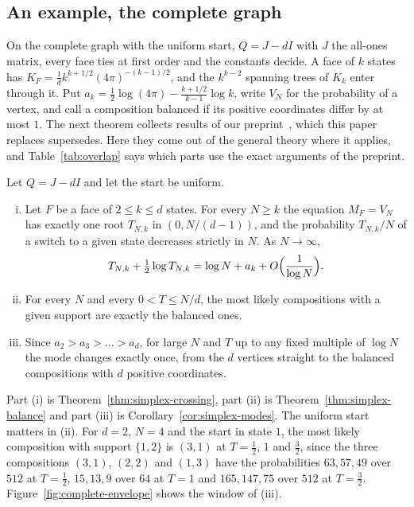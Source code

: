 \ifarxivbuild
\subsection{An example, the complete graph}\label{sec:intro-complete}

On the complete graph with the uniform start, $Q=J-dI$ with $J$ the all-ones
matrix, every face ties at first order and the constants decide. A face of $k$
states has $K_F=\frac1dk^{k+1/2}(4\pi)^{-(k-1)/2}$, and the $k^{k-2}$ spanning
trees of $K_k$ enter through it. Put
$a_k=\frac12\log(4\pi)-\frac{k+1/2}{k-1}\log k$, write $V_N$ for the
probability of a vertex, and call a composition balanced if its positive
coordinates differ by at most $1$. The next theorem collects results of our
preprint~\cite{paperB}, which this paper \ifarxivbuild replaces\else
supersedes\fi. Here they come out of the general theory where it applies, and
Table~\ref{tab:overlap} says which parts use the exact arguments of the
preprint.

\begin{introtheorem}\label{thm:C}
Let $Q=J-dI$ and let the start be uniform.
\begin{enumerate}[(i)]
\item Let $F$ be a face of $2\le k\le d$ states. For every $N\ge k$ the equation
$M_F=V_N$ has exactly one root $T_{N,k}$ in $(0,N/(d-1))$, and the probability
$T_{N,k}/N$ of a switch to a given state decreases strictly in $N$. As
$N\to\infty$,
\[
 T_{N,k}+\tfrac12\log T_{N,k}=\log N+a_k+O\Bigl(\frac1{\log N}\Bigr).
\]
\item For every $N$ and every $0<T\le N/d$, the most likely compositions with a
given support are exactly the balanced ones.
\item Since $a_2>a_3>\dots>a_d$, for large $N$ and $T$ up to any fixed multiple
of $\log N$ the mode changes exactly once, from the $d$ vertices straight to the
balanced compositions with $d$ positive coordinates.
\end{enumerate}
\end{introtheorem}

Part (i) is Theorem~\ref{thm:simplex-crossing}, part (ii) is
Theorem~\ref{thm:simplex-balance} and part (iii) is
Corollary~\ref{cor:simplex-modes}. The uniform start matters in (ii). For $d=2$,
$N=4$ and the start in state $1$, the most likely composition with support
$\{1,2\}$ is $(3,1)$ at $T=\frac12$, $1$ and $\frac32$, since the three
compositions $(3,1)$, $(2,2)$ and $(1,3)$ have the probabilities
$63,57,49$ over $512$ at $T=\frac12$, $15,13,9$ over $64$ at $T=1$ and
$165,147,75$ over $512$ at $T=\frac32$. Figure~\ref{fig:complete-envelope}
shows the window of (iii).

